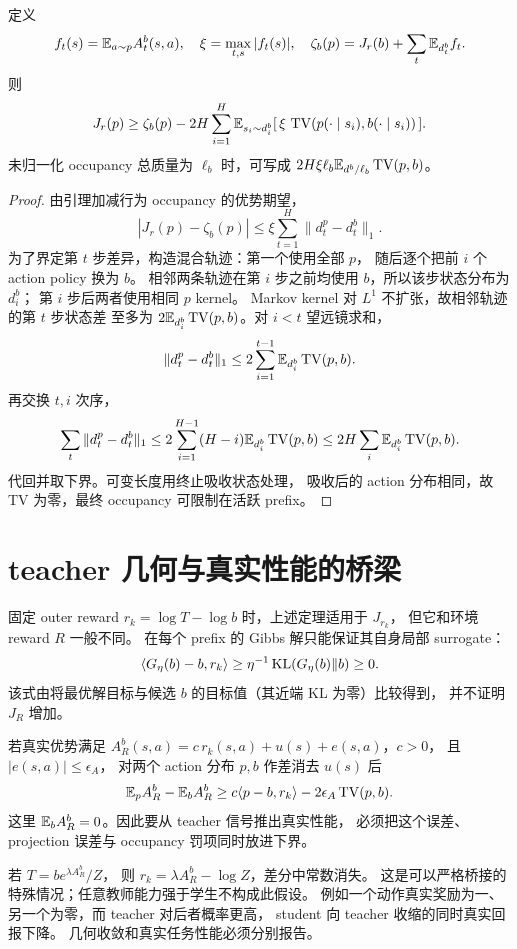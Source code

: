 \begin{theorem}\label{thm:finite-performance}
定义
\[
 f_t(s)=\mathbb{E}_{a\sim p}A^b_t(s,a),\quad
 \xi=\max_{t,s}|f_t(s)|,\quad
 \zeta_b(p)=J_r(b)+\sum_t\mathbb{E}_{d_t^b}f_t.
\]
则
\[
 J_r(p)\ge\zeta_b(p)-2H
       \sum_{i=1}^{H}\mathbb{E}_{s_i\sim d_i^b}
            [\,\xi\,\operatorname{TV}(p(\cdot\mid s_i),b(\cdot\mid s_i))\,].
\]
未归一化 occupancy 总质量为 $\ell_b$ 时，可写成
$2H\xi\ell_b\mathbb{E}_{d^b/\ell_b}\operatorname{TV}(p,b)$。
\end{theorem}
\begin{proof}
由引理加减行为 occupancy 的优势期望，
\[
 |J_r(p)-\zeta_b(p)|
 \le\xi\sum_{t=1}^{H}\|d_t^p-d_t^b\|_1.
\]
为了界定第 $t$ 步差异，构造混合轨迹：第一个使用全部 $p$，
随后逐个把前 $i$ 个 action policy 换为 $b$。
相邻两条轨迹在第 $i$ 步之前均使用 $b$，所以该步状态分布为 $d_i^b$；
第 $i$ 步后两者使用相同 $p$ kernel。
Markov kernel 对 $L^1$ 不扩张，故相邻轨迹的第 $t$ 步状态差
至多为 $2\mathbb{E}_{d_i^b}\operatorname{TV}(p,b)$。对 $i<t$ 望远镜求和，
\[
 \|d_t^p-d_t^b\|_1\le2\sum_{i=1}^{t-1}\mathbb{E}_{d_i^b}\operatorname{TV}(p,b).
\]
再交换 $t,i$ 次序，
\[
 \sum_t\|d_t^p-d_t^b\|_1
 \le2\sum_{i=1}^{H-1}(H-i)\mathbb{E}_{d_i^b}\operatorname{TV}(p,b)
 \le2H\sum_i\mathbb{E}_{d_i^b}\operatorname{TV}(p,b).
\]
代回并取下界。可变长度用终止吸收状态处理，
吸收后的 action 分布相同，故 TV 为零，最终 occupancy 可限制在活跃 prefix。
\end{proof}

\section{teacher 几何与真实性能的桥梁}
固定 outer reward $r_k=\log T-\log b$ 时，上述定理适用于 $J_{r_k}$，
但它和环境 reward $R$ 一般不同。
在每个 prefix 的 Gibbs 解只能保证其自身局部 surrogate：
\[
 \langle G_\eta(b)-b,r_k\rangle
 \ge\eta^{-1}\operatorname{KL}(G_\eta(b)\Vert b)\ge0.
\]
该式由将最优解目标与候选 $b$ 的目标值（其近端 KL 为零）比较得到，
并不证明 $J_R$ 增加。

若真实优势满足
$A_R^b(s,a)=c\,r_k(s,a)+u(s)+e(s,a)$，$c>0$，
且 $|e(s,a)|\le\epsilon_A$，
对两个 action 分布 $p,b$ 作差消去 $u(s)$ 后
\[
 \mathbb{E}_p A_R^b-\mathbb{E}_b A_R^b
 \ge c\langle p-b,r_k\rangle-2\epsilon_A\operatorname{TV}(p,b).
\]
这里 $\mathbb{E}_b A_R^b=0$。因此要从 teacher 信号推出真实性能，
必须把这个误差、projection 误差与 occupancy 罚项同时放进下界。

若 $T=b e^{\lambda A_R^b}/Z$，
则 $r_k=\lambda A_R^b-\log Z$，差分中常数消失。
这是可以严格桥接的特殊情况；任意教师能力强于学生不构成此假设。
例如一个动作真实奖励为一、另一个为零，而 teacher 对后者概率更高，
student 向 teacher 收缩的同时真实回报下降。
几何收敛和真实任务性能必须分别报告。

